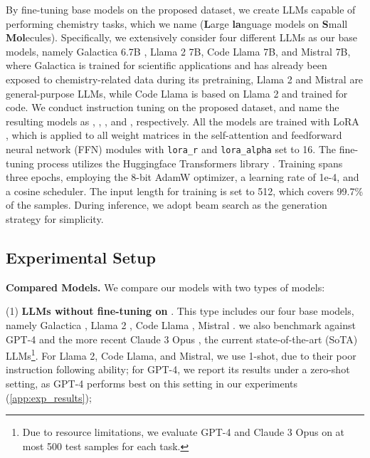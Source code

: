 By fine-tuning base models on the proposed \datasetname dataset, we create LLMs capable of performing chemistry tasks, which we name \modelname (\textbf{L}arge \textbf{la}nguage models on \textbf{S}mall \textbf{Mol}ecules).
Specifically, we extensively consider four different LLMs as our base models, namely Galactica 6.7B \citep{taylor2022galactica}, Llama 2 \citep{touvron2023llama2} 7B, Code Llama \citep{roziere2023code} 7B, and Mistral \citep{jiang2023mistral} 7B, where Galactica is trained for scientific applications and has already been exposed to chemistry-related data during its pretraining, Llama 2 and Mistral are general-purpose LLMs, while Code Llama is based on Llama 2 and trained for code.
We conduct instruction tuning on the proposed \datasetname dataset, and name the resulting models as \modelnameg, \modelnamel, \modelnamec, and \modelnamem, respectively. All the \modelname models are trained with LoRA \citep{hu2021lora}, which is applied to all weight matrices in the self-attention and feedforward neural network (FFN) modules with \texttt{lora\_r} and \texttt{lora\_alpha} set to 16. The fine-tuning process utilizes the Huggingface Transformers library \citep{wolf2020transformers}. Training spans three epochs, employing the 8-bit AdamW optimizer, a learning rate of 1e-4, and a cosine scheduler. The input length for training is set to 512, which covers 99.7\% of the samples. During inference, we adopt beam search as the generation strategy for simplicity.

\subsection{Experimental Setup}
\label{subsec:experimental}

\noindent \textbf{Compared Models.}
We compare our \modelname models with two types of models:

(1) \textbf{LLMs without fine-tuning on \datasetname}.
This type includes our four base models, namely Galactica \citep{taylor2022galactica}, Llama 2 \citep{touvron2023llama2}, Code Llama \citep{roziere2023code}, Mistral \citep{jiang2023mistral}.
we also benchmark against GPT-4 \citep{achiam2023gpt4} and the more recent Claude 3 Opus \citep{anthropic2024claude3}, the current state-of-the-art (SoTA) LLMs\footnote{Due to resource limitations, we evaluate GPT-4 and Claude 3 Opus on at most 500 test samples for each task.}. 
For Llama 2, Code Llama, and Mistral, we use 1-shot, due to their poor instruction following ability; for GPT-4, we report its results under a zero-shot setting, as GPT-4 performs best on this setting in our experiments %
(\cref{app:exp_results}); 

